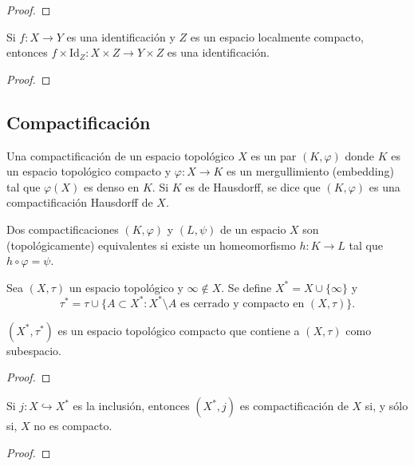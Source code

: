 \begin{proof}
\end{proof}
\begin{teorema}
    Si $f: X \to Y$ es una identificación y $Z$ es un espacio localmente compacto, entonces $f \times \mathrm{Id}_Z: X \times Z \to Y \times Z$ es una identificación.
\end{teorema}
\begin{proof}
\end{proof}

\subsection{Compactificación}

\begin{definición}[Compactificación]
    Una compactificación de un espacio topológico $X$ es un par $(K, \varphi)$ donde $K$ es un espacio topológico compacto y $\varphi: X \to K$ es un mergullimiento (embedding) tal que $\varphi(X)$ es denso en $K$. Si $K$ es de Hausdorff, se dice que $(K, \varphi)$ es una compactificación Hausdorff de $X$.
\end{definición}
\begin{definición}
    Dos compactificaciones $(K, \varphi)$ y $(L, \psi)$ de un espacio $X$ son (topológicamente) equivalentes si existe un homeomorfismo $h: K \to L$ tal que $h \circ \varphi = \psi$.
\end{definición}
\begin{definición}
    Sea $(X, \tau)$ un espacio topológico y $\infty \notin X$. Se define $X^* = X \cup \{\infty\}$ y
    $$\tau^* = \tau \cup \{A \subset X^* : X^* \setminus A \text{ es cerrado y compacto en } (X, \tau)\}.$$
\end{definición}
\begin{proposición}
    $(X^*, \tau^*)$ es un espacio topológico compacto que contiene a $(X, \tau)$ como subespacio.
\end{proposición}
\begin{proof}
\end{proof}
\begin{proposición}
    Si $j: X \hookrightarrow X^*$ es la inclusión, entonces $(X^*, j)$ es compactificación de $X$ si, y sólo si, $X$ no es compacto.
\end{proposición}
\begin{proof}
\end{proof}

